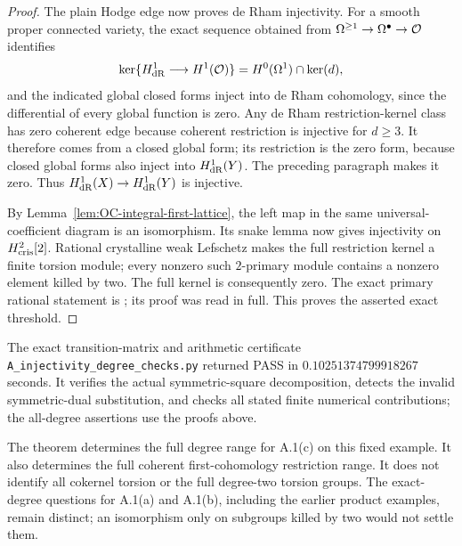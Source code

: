 \begin{proof}
The plain Hodge edge now proves de Rham injectivity.  For a smooth proper connected variety, the exact sequence obtained from
$\Omega^{\geq1}\to\Omega^\bullet\to\mathcal O$ identifies
\[
 \ker\{H^1_{\mathrm{dR}}\longrightarrow H^1(\mathcal O)\}
       =H^0(\Omega^1)\cap\ker(d),
\]
and the indicated global closed forms inject into de Rham cohomology, since the differential of every global function is zero.  Any de Rham restriction-kernel class has zero coherent edge because coherent restriction is injective for $d\geq3$.  It therefore comes from a closed global form; its restriction is the zero form, because closed global forms also inject into $H^1_{\mathrm{dR}}(Y)$.  The preceding paragraph makes it zero.  Thus $H^1_{\mathrm{dR}}(X)\to H^1_{\mathrm{dR}}(Y)$ is injective.

By Lemma~\ref{lem:OC-integral-first-lattice}, the left map in the same universal-coefficient diagram is an isomorphism.  Its snake lemma now gives injectivity on $H^2_{\mathrm{cris}}[2]$.  Rational crystalline weak Lefschetz makes the full restriction kernel a finite torsion module; every nonzero such $2$-primary module contains a nonzero element killed by two.  The full kernel is consequently zero.  The exact primary rational statement is
\cite[Appendix~9, Theorem~9.1 and Corollary~9.3, pp.~63--64, arXiv version~3]{NakkajimaYobuko2022}; its proof was read in full.  This proves the asserted exact threshold.
\end{proof}

\begin{remark}
\label{rem:OC-exact-degree-scope}
The exact transition-matrix and arithmetic certificate \texttt{A\_injectivity\_degree\_checks.py} returned PASS in $0.10251374799918267$ seconds.  It verifies the actual symmetric-square decomposition, detects the invalid symmetric-dual substitution, and checks all stated finite numerical contributions; the all-degree assertions use the proofs above.

The theorem determines the full degree range for A.1(c) on this fixed example.  It also determines the full coherent first-cohomology restriction range.  It does not identify all cokernel torsion or the full degree-two torsion groups.  The exact-degree questions for A.1(a) and A.1(b), including the earlier product examples, remain distinct; an isomorphism only on subgroups killed by two would not settle them.
\end{remark}
